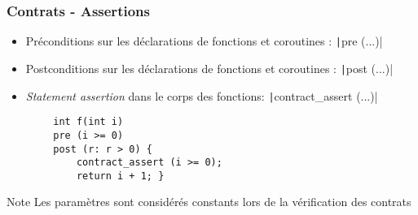 \documentclass[C++.tex]{subfiles}
\begin{document}
\begin{frame}[fragile]
	\frametitle{Contrats - Assertions}
	\begin{itemize}
		\item Préconditions sur les déclarations de fonctions et coroutines : \texttt|pre (...)|
		\item Postconditions sur les déclarations de fonctions et coroutines : \texttt|post (...)|
		\item \textit{Statement assertion} dans le corps des fonctions: \texttt|contract_assert (...)|
	\end{itemize}

	\begin{verbatim}
		int f(int i)
		pre (i >= 0)
		post (r: r > 0) {
			contract_assert (i >= 0);
			return i + 1; }
	\end{verbatim}

	\begin{block}{Note}
		Les paramètres sont considérés constants lors de la vérification des contrats
	\end{block}


\end{frame}
\end{document}
